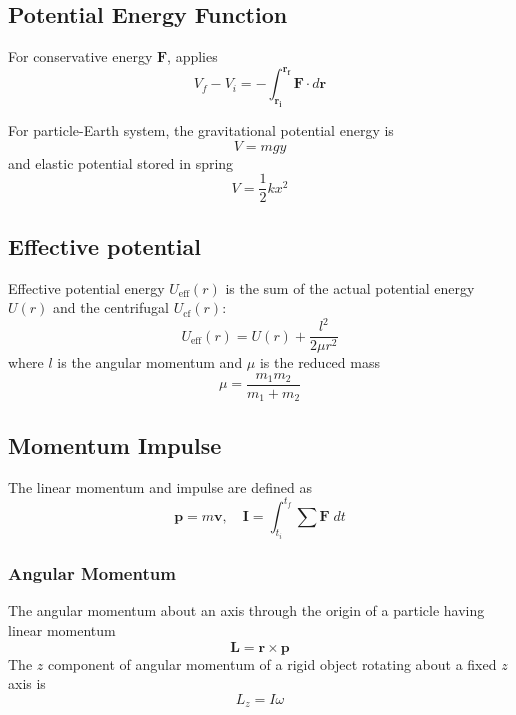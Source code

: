 \documentclass[../../../main.tex]{subfiles}
\begin{document}
\subsection*{Potential Energy Function}
For conservative energy $\mathbf{F}$, applies
\begin{equation*}
    V_f-V_i=-\int_{\mathbf{r_i}}^{\mathbf{r_f}}\mathbf{F}\cdot d\mathbf{r}
\end{equation*}

For particle-Earth system, the gravitational potential energy is
\begin{equation*}
    V=mgy
\end{equation*}
and elastic potential stored in spring
\begin{equation*}
    V=\frac{1}{2}kx^2
\end{equation*}

\subsection*{Effective potential}
Effective potential energy $U_\text{eff} (r)$ is the sum of the actual potential energy $U(r)$ and the centrifugal $U_\text{cf} (r)$:
\begin{equation*}
    U_\text{eff} (r)=U(r)+\frac{l^2}{2\mu r^2}
\end{equation*}
where $l$ is the angular momentum and $\mu$ is the reduced mass
\begin{equation*}
    \mu=\frac{m_1m_2}{m_1+m_2}
\end{equation*}

\subsection*{Momentum Impulse}
The linear momentum and impulse are defined as 
\begin{equation*}
    \mathbf{p}=m\mathbf{v},\quad \mathbf{I}=\int_{t_i}^{t_f}\sum \mathbf{F}\;dt
\end{equation*}

\subsubsection*{Angular Momentum} 
The angular momentum about an axis through the origin of a particle having linear momentum
\begin{equation*}
    \mathbf{L}=\mathbf{r}\times \mathbf{p}
\end{equation*}
The $z$ component of angular momentum of a rigid object rotating about a fixed $z$ axis is
\begin{equation*}
    L_z=I\omega
\end{equation*}
\end{document}
